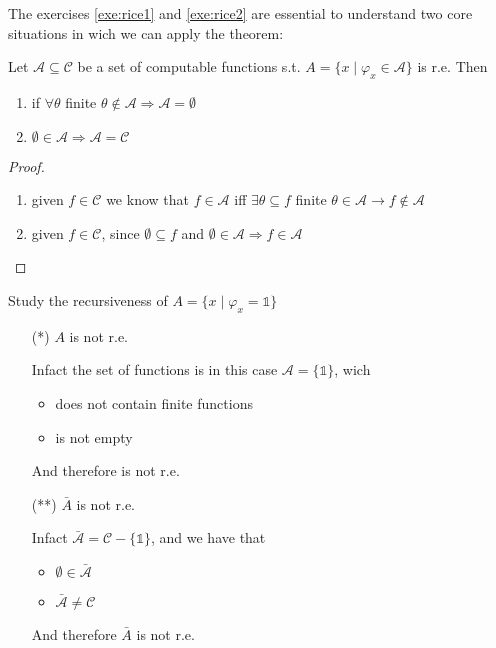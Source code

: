 The exercises \ref{exe:rice1} and \ref{exe:rice2} are essential to
understand two core situations in wich we can apply the theorem:

\begin{observation}
  Let $\mathcal{A} \subseteq \mathcal{C}$ be a set of computable
  functions s.t. $A = \{ x \mid \varphi_x \in \mathcal{A}\}$ is
  r.e. Then
  \begin{enumerate}[label=(i)]
  \item if \(\forall \theta \) finite
    \( \theta \notin \mathcal{A} \Rightarrow \mathcal{A} = \emptyset\)
  \item
    \(\emptyset \in \mathcal{A} \Rightarrow \mathcal{A} =
    \mathcal{C}\)
  \end{enumerate}

  \begin{proof}
    \begin{enumerate}[label=(i)]
    \item given $f \in \mathcal{C}$ we know that $f \in \mathcal{A}$
      iff $\exists \theta \subseteq f$ finite
      $\theta \in \mathcal{A} \rightarrow f \notin \mathcal{A}$
    \item given $f \in \mathcal{C}$, since $\emptyset \subseteq f$ and
      $\emptyset \in \mathcal{A} \Rightarrow f \in \mathcal{A}$
    \end{enumerate}
  \end{proof}
\end{observation}

\begin{exercise}
  Study the recursiveness of $A = \{x \mid \varphi_x = \mathds{1}\}$

  \begin{enumerate}
  \item[(*)] $A$ is not r.e.

    Infact the set of functions is in this case
    $\mathcal{A} = \{\mathds{1}\}$, wich
    \begin{itemize}
    \item does not contain finite functions
    \item is not empty
    \end{itemize}
    And therefore is not r.e.

  \item[(**)] $\bar{A}$ is not r.e.

    Infact $\bar{\mathcal{A}} = \mathcal{C} - \{\mathds{1}\}$, and we
    have that
    \begin{itemize}
    \item $\emptyset \in \bar{\mathcal{A}}$
    \item $\bar{\mathcal{A}} \neq \mathcal{C}$
    \end{itemize}
    And therefore $\bar{A}$ is not r.e.
  \end{enumerate}
\end{exercise}